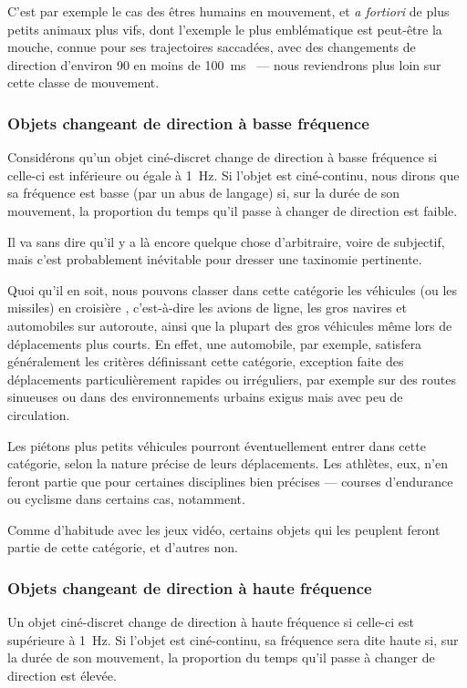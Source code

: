 	C'est par exemple le cas des êtres humains en mouvement, et \emph{a fortiori} de plus petits animaux plus vifs, dont l'exemple le plus emblématique est peut-être la mouche, connue pour ses trajectoires saccadées, avec des changements de direction d'environ 90\textdegree{} en moins de 100~ms~\cite{tammero2002influence, collett1975visual, wagner1986flight, schilstra1999blowfly} --- nous reviendrons plus loin sur cette classe de mouvement.
	
	\subsubsection{Objets changeant de direction à basse fréquence}
	Considérons qu'un objet ciné-discret change de direction à basse fréquence si celle-ci est inférieure ou égale à 1~Hz. Si l'objet est ciné-continu, nous dirons que sa fréquence est basse (par un abus de langage) si, sur la durée de son mouvement, la proportion du temps qu'il passe à changer de direction est faible.
	
	Il va sans dire qu'il y a là encore quelque chose d'arbitraire, voire de subjectif, mais c'est probablement inévitable pour dresser une taxinomie pertinente.
	
	Quoi qu'il en soit, nous pouvons classer dans cette catégorie les véhicules (ou les missiles) \og en croisière \fg{}, c'est-à-dire les avions de ligne, les gros navires et automobiles sur autoroute, ainsi que la plupart des gros véhicules même lors de déplacements plus courts. En effet, une automobile, par exemple, satisfera généralement les critères définissant cette catégorie, exception faite des déplacements particulièrement rapides ou irréguliers, par exemple sur des routes sinueuses ou dans des environnements urbains exigus mais avec peu de circulation.
	
	Les piétons plus petits véhicules pourront éventuellement entrer dans cette catégorie, selon la nature précise de leurs déplacements. Les athlètes, eux, n'en feront partie que pour certaines disciplines bien précises --- courses d'endurance ou cyclisme dans certains cas, notamment.
	
	Comme d'habitude avec les jeux vidéo, certains objets qui les peuplent feront partie de cette catégorie, et d'autres non.
	
	\subsubsection{Objets changeant de direction à haute fréquence}
	Un objet ciné-discret change de direction à haute fréquence si celle-ci est supérieure à 1~Hz. Si l'objet est ciné-continu, sa fréquence sera dite haute si, sur la durée de son mouvement, la proportion du temps qu'il passe à changer de direction est élevée.
	
